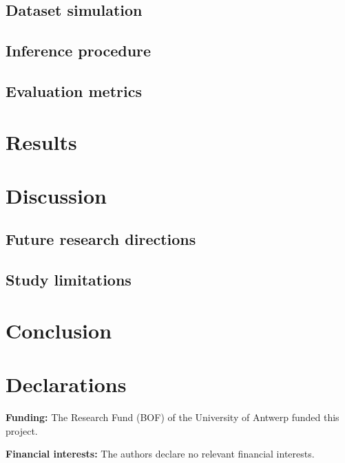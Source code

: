 \documentclass[
  authoryear,
  review,
  1p]{elsarticle}
\begin{document}
\subsection{Dataset simulation}\label{sec-simulation}

\subsection{Inference procedure}\label{sec-inference}

\subsection{Evaluation metrics}\label{sec-evaluation}

\section{Results}\label{sec-results}

\section{Discussion}\label{sec-discussion}

\subsection{Future research directions}\label{sec-discussion_RD}

\subsection{Study limitations}\label{sec-discussion_limitations}

\section{Conclusion}\label{sec-conclusion}

\newpage{}

\section*{Declarations}\label{declarations}

\textbf{Funding:} The Research Fund (BOF) of the University of Antwerp
funded this project.

\textbf{Financial interests:} The authors declare no relevant financial
interests.
\end{document}
